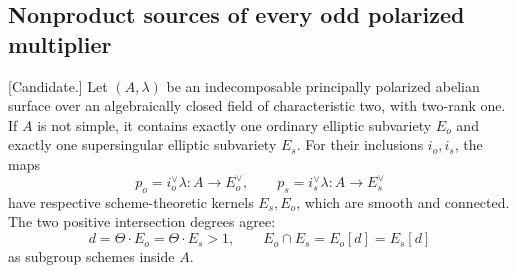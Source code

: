 \subsection{Nonproduct sources of every odd polarized multiplier}
\label{subsec:nonordinary-arbitrary-odd-neighbors-candidate}

\begin{lemma}
\label{lem:nonordinary-mixed-principal-complement-candidate}
\textup{[Candidate.]}
Let $(A,\lambda)$ be an indecomposable principally polarized abelian
surface over an algebraically closed field of characteristic two,
with two-rank one. If $A$ is not simple, it contains exactly one
ordinary elliptic subvariety $E_o$ and exactly one supersingular
elliptic subvariety $E_s$. For their inclusions $i_o,i_s$, the maps
\[
 p_o=i_o^\vee\lambda:A\longrightarrow E_o^\vee,
 \qquad p_s=i_s^\vee\lambda:A\longrightarrow E_s^\vee
\]
have respective scheme-theoretic kernels $E_s,E_o$, which are smooth
and connected. The two positive intersection degrees agree:
\[
 d=\Theta\cdot E_o=\Theta\cdot E_s>1,
 \qquad E_o\cap E_s=E_o[d]=E_s[d]
\]
as subgroup schemes inside $A$.
\end{lemma}

